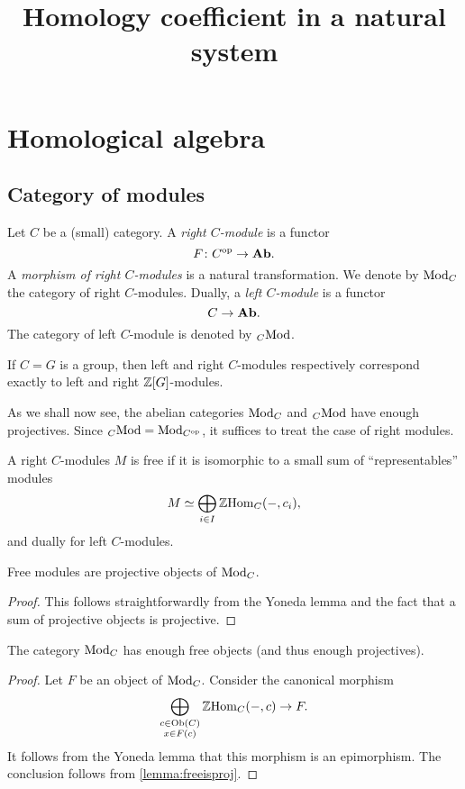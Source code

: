 \documentclass{amsart}
\title{Homology coefficient in a natural system}
\renewcommand{\homset}[3]{\mathrm{Hom}_{#1}(#2,#3)}
\begin{document}
\section{Homological algebra}
\subsection{Category of modules}
\begin{definition}
  Let $C$ be a (small) category. A \emph{right $C$\nbd-module} is a
  functor
  \[
    F \colon C^{{\mathrm{op}}} \to \mathbf{Ab}.
  \]
  A \emph{morphism of right $C$\nbd-modules} is a natural
  transformation. We denote by $\mathrm{Mod}_{C}$ the category of right
  $C$\nbd-modules. Dually, a \emph{left $C$\nbd-module} is a functor
  \[
    C \to \mathbf{Ab}.
  \]
  The category of left $C$\nbd-module is denoted by ${}_{C}\mathrm{Mod}$.
\end{definition}
\begin{example}
  If $C=G$ is a group, then left and right $C$\nbd-modules
  respectively correspond
  exactly to left and right $\mathbb Z[G]$\nbd-modules. 
\end{example}

As we shall now see, the abelian categories $\mathrm{Mod}_{C}$ and ${}_{C}\mathrm{Mod}$
have enough projectives. Since ${}_{C}\mathrm{Mod}=\mathrm{Mod}_{C^{{\mathrm{op}}}}$, it suffices
to treat the case of right modules.

\begin{definition}
  A right $C$\nbd-modules $M$ is free if it is isomorphic to a small
  sum
  of ``representables'' modules
  \[
  M \simeq \bigoplus_{i \in I}\Z\homset{C}{-}{c_i},
\]
and dually for left $C$\nbd-modules.
\end{definition}
\begin{lemma}\label{lemma:freeisproj}
  Free modules are projective objects of $\mathrm{Mod}_{C}$.
\end{lemma}
\begin{proof}
  This follows straightforwardly from the Yoneda lemma and the fact
  that a sum of projective objects is projective.
\end{proof}
\begin{proposition}\label{prop:enoughproj}
  The category $\mathrm{Mod}_{C}$ has enough free objects (and thus enough projectives).
\end{proposition}
\begin{proof}
  Let $F$ be an object of $\mathrm{Mod}_{C}$. Consider the canonical
  morphism
  \[
    \bigoplus_{\substack{c \in \Ob(C)\\ x \in F(c)}} \Z\homset{C}{-}{c} \to F.
  \]
 It follows from the Yoneda lemma that this morphism is
  an epimorphism. The conclusion follows from \cref{lemma:freeisproj}.
\end{proof}
\end{document}
